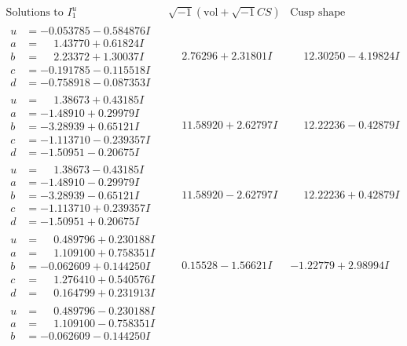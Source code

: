 \documentclass[1p]{elsarticle_modified}
\theoremstyle{definition}
\newcommand{\I}{\sqrt{-1}}
\begin{document}
$$\begin{array}{c|c|c}
\text{Solutions to }I^u_{1}& \I (\text{vol} + \sqrt{-1}CS) & \text{Cusp shape}\\
 \hline 
\begin{aligned}
u &= -0.053785 - 0.584876 I \\
a &= \phantom{-}1.43770 + 0.61824 I \\
b &= \phantom{-}2.23372 + 1.30037 I \\
c &= -0.191785 - 0.115518 I \\
d &= -0.758918 - 0.087353 I\end{aligned}
 & \phantom{-}2.76296 + 2.31801 I & \phantom{-}12.30250 - 4.19824 I \\ \hline\begin{aligned}
u &= \phantom{-}1.38673 + 0.43185 I \\
a &= -1.48910 + 0.29979 I \\
b &= -3.28939 + 0.65121 I \\
c &= -1.113710 - 0.239357 I \\
d &= -1.50951 - 0.20675 I\end{aligned}
 & \phantom{-}11.58920 + 2.62797 I & \phantom{-}12.22236 - 0.42879 I \\ \hline\begin{aligned}
u &= \phantom{-}1.38673 - 0.43185 I \\
a &= -1.48910 - 0.29979 I \\
b &= -3.28939 - 0.65121 I \\
c &= -1.113710 + 0.239357 I \\
d &= -1.50951 + 0.20675 I\end{aligned}
 & \phantom{-}11.58920 - 2.62797 I & \phantom{-}12.22236 + 0.42879 I \\ \hline\begin{aligned}
u &= \phantom{-}0.489796 + 0.230188 I \\
a &= \phantom{-}1.109100 + 0.758351 I \\
b &= -0.062609 + 0.144250 I \\
c &= \phantom{-}1.276410 + 0.540576 I \\
d &= \phantom{-}0.164799 + 0.231913 I\end{aligned}
 & \phantom{-}0.15528 - 1.56621 I & -1.22779 + 2.98994 I \\ \hline\begin{aligned}
u &= \phantom{-}0.489796 - 0.230188 I \\
a &= \phantom{-}1.109100 - 0.758351 I \\
b &= -0.062609 - 0.144250 I \\

\end{aligned}
\end{array}$$
\end{document}
